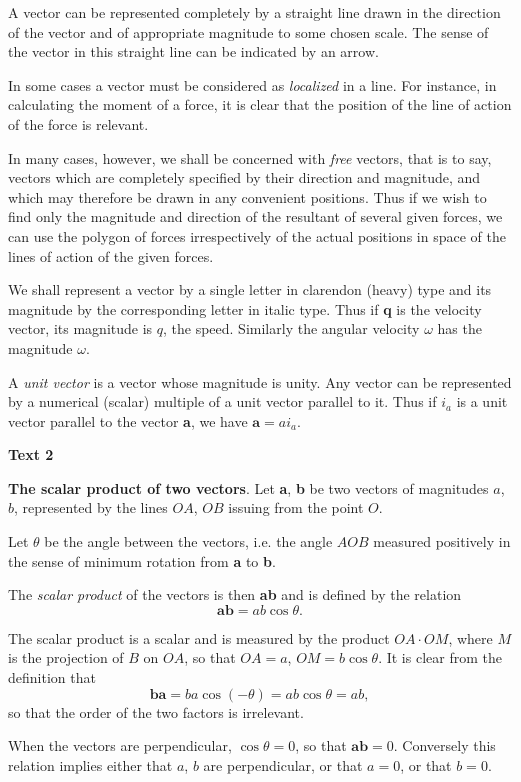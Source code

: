 \documentclass[a4paper]{article}
\newcommand{\ESect}[1]{\medskip\par{\large \textbf{#1}}\par}
\begin{document}
A vector can be represented completely by a straight line drawn in the direction of the vector and of appropriate magnitude to
some chosen scale. The sense of the vector in this straight line can be indicated by an arrow.

In some cases a vector must be considered as \textit{localized} in a line. For instance, in calculating the moment of a force,
it is clear that the position of the line of action of the force is relevant.

In many cases, however, we shall be concerned with \textit{free} vectors, that is to say, vectors which are completely specified
by their direction and magnitude, and which may therefore be drawn in any convenient positions. Thus if we wish to find only the
magnitude and direction of the resultant of several given forces, we can use the polygon of forces irrespectively of the actual
positions in space of the lines of action of the given forces.

We shall represent a vector by a single letter in clarendon (heavy) type and its magnitude by the corresponding letter in italic
type. Thus if \textbf{q} is the velocity vector, its magnitude is $q$, the speed. Similarly the angular velocity $\omega$ has
the magnitude $\omega$.

A \textit{unit vector} is a vector whose magnitude is unity. Any vector can be represented by a numerical (scalar) multiple of
a unit vector parallel to it. Thus if $i_a$ is a unit vector parallel to the vector \textbf{a}, we have $\textbf{a}=ai_a$.

\ESect{Text 2}
\textbf{The scalar product of two vectors}. Let \textbf{a}, \textbf{b} be two vectors of magnitudes $a$, $b$, represented by
the lines $OA$, $OB$ issuing from the point $O$.

Let $\theta$ be the angle between the vectors, i.e. the angle $AOB$ measured positively in the sense of minimum rotation
from \textbf{a} to \textbf{b}.

The \textit{scalar product} of the vectors is then \textbf{ab} and is defined by the relation
$$\textbf{ab}=ab \cos \theta.$$

The scalar product is a scalar and is measured by the product $OA \cdot OM$, where $M$ is the projection of $B$ on $OA$, so
that $OA = a$, $OM = b \cos \theta$. It is clear from the definition that
$$\textbf{ba} = ba \cos(-\theta)=ab \cos \theta = ab,$$
so that the order of the two factors is irrelevant.

When the vectors are perpendicular, $\cos \theta = 0$, so that $\textbf{ab} = 0$. Conversely this relation implies either
that $a$, $b$ are perpendicular, or that $a = 0$, or that $b = 0$.
\end{document}
